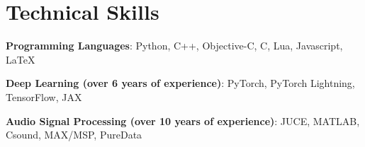 \section{Technical Skills}
\resumeSubHeadingListStart
\item{\textbf{Programming Languages}: Python, C++, Objective-C, C, Lua, Javascript, \LaTeX{}}
\item{\textbf{Deep Learning (over 6 years of experience)}: PyTorch, PyTorch Lightning, TensorFlow, JAX}
\item{\textbf{Audio Signal Processing (over 10 years of experience)}: JUCE, MATLAB, Csound, MAX/MSP, PureData}
\resumeSubHeadingListEnd